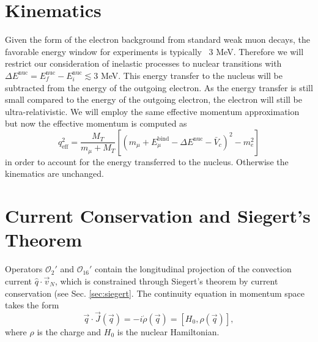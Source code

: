 \documentclass{book}[letterpaper,12pt]
\begin{document}
\section{Kinematics}
Given the form of the electron background from standard weak muon decays, the favorable energy window for experiments is typically ~3 MeV. Therefore we will restrict our consideration of inelastic processes to nuclear transitions with $\Delta E^\mathrm{nuc}=E^\mathrm{nuc}_f-E^\mathrm{nuc}_i \lesssim 3$ MeV. This energy transfer to the nucleus will be subtracted from the energy of the outgoing electron. As the energy transfer is still small compared to the energy of the outgoing electron, the electron will still be ultra-relativistic. We will employ the same effective momentum approximation but now the effective momentum is computed as
\begin{equation}
q^2_\mathrm{eff}=\frac{M_T}{m_{\mu}+M_T}\left[\left(m_{\mu}+E_{\mu}^\mathrm{bind}-\Delta E^\mathrm{nuc}-\bar{V}_c\right)^2-m_e^2\right]
\end{equation}
in order to account for the energy transferred to the nucleus. Otherwise the kinematics are unchanged.
\section{Current Conservation and Siegert's Theorem}
Operators $\mathcal{O}_2'$ and $\mathcal{O}_{16}'$ contain the longitudinal projection of the convection current $\hat{q}\cdot\vec{v}_N$, which is constrained through Siegert's theorem by current conservation (see Sec. \ref{sec:siegert}.
The continuity equation in momentum space takes the form
\begin{equation}
\vec{q}\cdot\vec{J}(\vec{q})=-i\dot{\rho}(\vec{q})=\left[H_0,\rho(\vec{q})\right],
\end{equation}
where $\rho$ is the charge and $H_0$ is the nuclear Hamiltonian.
\end{document}
